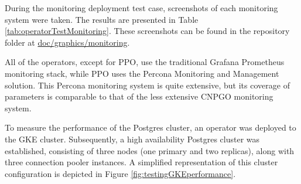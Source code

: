 \label{chap:monitoring}
During the monitoring deployment test case, screenshots of each monitoring system were taken. The results are presented in Table \ref{tab:operatorTestMonitoring}.
These screenshots can be found in the repository folder at \url{doc/graphics/monitoring}.

All of the operators, except for PPO, use the traditional Grafana Prometheus monitoring stack, while PPO uses the Percona Monitoring and Management solution.
This Percona monitoring system is quite extensive, but its coverage of parameters is comparable to that of the less extensive CNPGO monitoring system.


\label{chap:performance}
To measure the performance of the Postgres cluster, an operator was deployed to the GKE cluster. Subsequently, a high availability Postgres cluster was established, consisting of three nodes (one primary and two replicas), along with three connection pooler instances.
A simplified representation of this cluster configuration is depicted in Figure \ref{fig:testingGKEperformance}.


